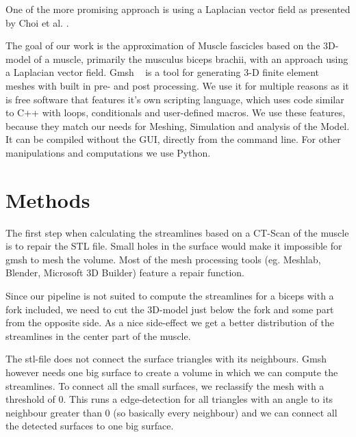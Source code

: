 \documentclass[preprint,journal]{vgtc}       %
\begin{document}
One of the more promising approach is using a Laplacian vector field as presented by Choi et al. \cite{Choi2013}. 

The goal of our work is the approximation of Muscle fascicles based on the 3D-model of a muscle, primarily the musculus biceps brachii, with an approach using a Laplacian vector field. 
Gmsh ~\cite{Geuzaine2009} is a tool for generating 3-D finite element meshes with built in pre- and post processing. We use it for multiple reasons as it is free software that features it's own scripting language, which uses code similar to C++ with loops, conditionals and user-defined macros. We use these features, because they match our needs for Meshing, Simulation and analysis of the Model. It can be compiled without the GUI, directly from the command line. For other manipulations and computations we use Python.

%
%
%
\section{Methods}
The first step when calculating the streamlines based on a CT-Scan of the muscle is to repair the STL file. Small holes in the surface would make it impossible for gmsh to mesh the volume. Most of the mesh processing tools (eg. Meshlab, Blender, Microsoft 3D Builder) feature a repair function. %

Since our pipeline is not suited to compute the streamlines for a biceps with a fork included, we need to cut the 3D-model just below the fork and some part from the opposite side. As a nice side-effect we get a better distribution of the streamlines in the center part of the muscle. %

The stl-file does not connect the surface triangles with its neighbours. Gmsh however needs one big surface to create a 
volume in which we can compute the streamlines. To connect all the small surfaces, we reclassify the mesh with a threshold of 0.
This runs a edge-detection for all triangles with an angle to its neighbour greater than 0 (so basically every neighbour) and we can connect all the 
detected surfaces to one big surface.
\end{document}
